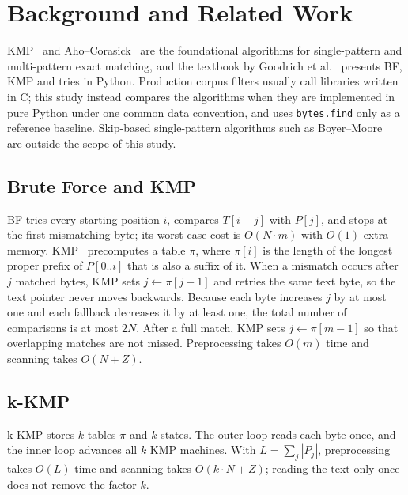 \documentclass[conference]{IEEEtran}
\begin{document}
\section{Background and Related Work}
KMP~\cite{kmp} and Aho--Corasick~\cite{ac} are the foundational algorithms for single-pattern and multi-pattern exact matching, and the textbook by Goodrich et al.~\cite{goodrich} presents BF, KMP and tries in Python. Production corpus filters usually call libraries written in C; this study instead compares the algorithms when they are implemented in pure Python under one common data convention, and uses \texttt{bytes.find} only as a reference baseline. Skip-based single-pattern algorithms such as Boyer--Moore~\cite{bm} are outside the scope of this study.

\subsection{Brute Force and KMP}
BF tries every starting position $i$, compares $T[i+j]$ with $P[j]$, and stops at the first mismatching byte; its worst-case cost is $O(N\cdot m)$ with $O(1)$ extra memory. KMP~\cite{kmp} precomputes a table $\pi$, where $\pi[i]$ is the length of the longest proper prefix of $P[0..i]$ that is also a suffix of it. When a mismatch occurs after $j$ matched bytes, KMP sets $j\leftarrow\pi[j-1]$ and retries the same text byte, so the text pointer never moves backwards. Because each byte increases $j$ by at most one and each fallback decreases it by at least one, the total number of comparisons is at most $2N$. After a full match, KMP sets $j\leftarrow\pi[m-1]$ so that overlapping matches are not missed. Preprocessing takes $O(m)$ time and scanning takes $O(N+Z)$.

\subsection{k-KMP}
k-KMP stores $k$ tables $\pi$ and $k$ states. The outer loop reads each byte once, and the inner loop advances all $k$ KMP machines. With $L=\sum_j |P_j|$, preprocessing takes $O(L)$ time and scanning takes $O(k\cdot N+Z)$; reading the text only once does not remove the factor $k$.
\end{document}
